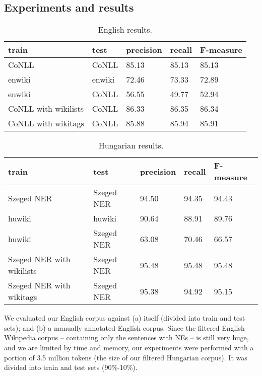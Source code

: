 \documentclass[11pt]{article}
\begin{document}
\subsection{Experiments and results}

\begin{table*}[ht]
\begin{center}
\begin{tabular}{lllll}
\hline \bf train & \bf test & \bf precision & \bf recall & \bf F-measure \\ \hline
CoNLL & CoNLL & 85.13 & 85.13 & 85.13 \\
enwiki & enwiki & 72.46 & 73.33 &  72.89 \\
enwiki & CoNLL & 56.55 & 49.77 & 52.94 \\
CoNLL with wikilists & CoNLL & 86.33 & 86.35 & 86.34 \\
CoNLL with wikitags & CoNLL & 85.88 & 85.94 & 85.91 \\
\hline
\end{tabular}
\end{center}
\caption{\label{enresults} English results.}
\end{table*}

\begin{table*}[ht]
\begin{center}
\begin{tabular}{lllll}
\hline \bf train & \bf test & \bf precision & \bf recall & \bf F-measure \\ \hline
Szeged NER & Szeged NER & 94.50 & 94.35 & 94.43 \\
huwiki & huwiki & 90.64 & 88.91 &  89.76 \\
huwiki & Szeged NER & 63.08 & 70.46 & 66.57 \\
Szeged NER with wikilists & Szeged NER & 95.48 & 95.48 & 95.48 \\
Szeged NER with wikitags & Szeged NER & 95.38 & 94.92 & 95.15 \\
\hline
\end{tabular}
\end{center}
\caption{\label{huresults} Hungarian results.}
\end{table*}

We evaluated our English corpus against (a) itself (divided into train and test sets); and (b) a manually annotated English corpus. Since the filtered English Wikipedia corpus -- containing only the sentences with NEs -- is still very huge, and we are limited by time and memory, our experiments were performed with a portion of 3.5 million tokens (the size of our filtered Hungarian corpus). It was divided into train and test sets (90\%-10\%). 
\end{document}
